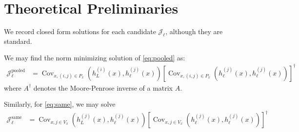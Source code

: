 \documentclass[10pt,oneside,reqno]{amsart}
\theoremstyle{definition}
\numberwithin{equation}{section}
\newcommand{\cJ}{{\mathcal{J}}}
\DeclareMathOperator*{\argmin}{arg\,min}
\newcommand{\bbR}{\mathbb{R}}
\newcommand{\bbE}{\mathbb{E}}
\begin{document}
%
%
%
%




\section{Theoretical Preliminaries}
We record closed form solutions for each candidate $\cJ_\ell$, although they are standard. 

We may find the norm minimizing solution of \eqref{eq:pooled} as:
\begin{align*}
\mathcal J_\ell^{\mathrm{pooled}}
&=
\operatorname{Cov}_{x,(i,j)\in P_x}
\left(h_L^{(i)}(x),h_\ell^{(j)}(x)\right)
\left[
\operatorname{Cov}_{x,(i,j)\in P_x}
\left(h_\ell^{(j)}(x),h_\ell^{(j)}(x)\right)
\right]^\dagger
\end{align*}
where $A^\dagger$ denotes the Moore-Penrose inverse of a matrix $A$.


Similarly, for \eqref{eq:same}, we may solve
\begin{align*}
\mathcal J_\ell^{\mathrm{same}}
&=
\operatorname{Cov}_{x,j\in V_x}
\left(h_L^{(j)}(x),h_\ell^{(j)}(x)\right)
\left[
\operatorname{Cov}_{x,j\in V_x}
\left(h_\ell^{(j)}(x),h_\ell^{(j)}(x)\right)
\right]^\dagger
\end{align*}
\end{document}
